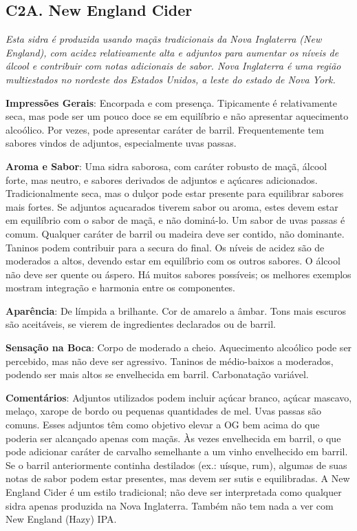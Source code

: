 \subsection*{C2A. New England Cider}

\textit{Esta sidra é produzida usando maçãs tradicionais da Nova Inglaterra (New England), com acidez relativamente alta e adjuntos para aumentar os níveis de álcool e contribuir com notas adicionais de sabor. Nova Inglaterra é uma região multiestados no nordeste dos Estados Unidos, a leste do estado de Nova York.}

\textbf{Impressões Gerais}: Encorpada e com presença. Tipicamente é relativamente seca, mas pode ser um pouco doce se em equilíbrio e não apresentar aquecimento alcoólico. Por vezes, pode apresentar caráter de barril. Frequentemente tem sabores vindos de adjuntos, especialmente uvas passas.

\textbf{Aroma e Sabor}: Uma sidra saborosa, com caráter robusto de maçã, álcool forte, mas neutro, e sabores derivados de adjuntos e açúcares adicionados. Tradicionalmente seca, mas o dulçor pode estar presente para equilibrar sabores mais fortes. Se adjuntos açucarados tiverem sabor ou aroma, estes devem estar em equilíbrio com o sabor de maçã, e não dominá-lo. Um sabor de uvas passas é comum. Qualquer caráter de barril ou madeira deve ser contido, não dominante. Taninos podem contribuir para a secura do final. Os níveis de acidez são de moderados a altos, devendo estar em equilíbrio com os outros sabores. O álcool não deve ser quente ou áspero. Há muitos sabores possíveis; os melhores exemplos mostram integração e harmonia entre os componentes.

\textbf{Aparência}: De límpida a brilhante. Cor de amarelo a âmbar. Tons mais escuros são aceitáveis, se vierem de ingredientes declarados ou de barril.

\textbf{Sensação na Boca}: Corpo de moderado a cheio. Aquecimento alcoólico pode ser percebido, mas não deve ser agressivo. Taninos de médio-baixos a moderados, podendo ser mais altos se envelhecida em barril. Carbonatação variável.

\textbf{Comentários}: Adjuntos utilizados podem incluir açúcar branco, açúcar mascavo, melaço, xarope de bordo ou pequenas quantidades de mel. Uvas passas são comuns. Esses adjuntos têm como objetivo elevar a OG bem acima do que poderia ser alcançado apenas com maçãs. Às vezes envelhecida em barril, o que pode adicionar caráter de carvalho semelhante a um vinho envelhecido em barril. Se o barril anteriormente continha destilados (ex.: uísque, rum), algumas de suas notas de sabor podem estar presentes, mas devem ser sutis e equilibradas. A New England Cider é um estilo tradicional; não deve ser interpretada como qualquer sidra apenas produzida na Nova Inglaterra. Também não tem nada a ver com New England (Hazy) IPA.

